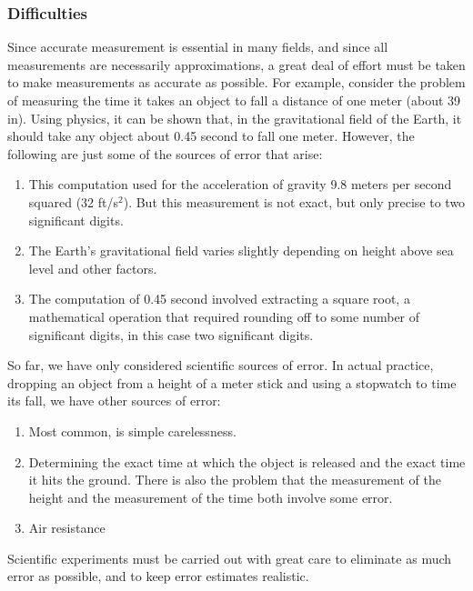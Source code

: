 \subsubsection*{Difficulties}
Since accurate measurement is essential in many fields, and since all measurements are
necessarily approximations, a great deal of effort must be taken to make measurements as
accurate as possible. For example, consider the problem of measuring the time it takes an
object to fall a distance of one meter (about 39 in). Using physics, it can be shown that, in
the gravitational field of the Earth, it should take any object about 0.45 second to fall one
meter. However, the following are just some of the sources of error that arise:
\begin{enumerate}
\item This computation used for the acceleration of gravity 9.8 meters per second squared
(32 ft/s$^2$). But this measurement is not exact, but only precise to two significant
digits.
\item The Earth's gravitational field varies slightly depending on height above sea level and
other factors.
\item The computation of 0.45 second involved extracting a square root, a mathematical
operation that required rounding off to some number of significant digits, in this
case two significant digits.
\end{enumerate}
So far, we have only considered scientific sources of error. In actual practice, dropping
an object from a height of a meter stick and using a stopwatch to time its fall, we have other
sources of error:
\begin{enumerate}
\item Most common, is simple carelessness.
\item Determining the exact time at which the object is released and the exact time it hits
the ground. There is also the problem that the measurement of the height and the
measurement of the time both involve some error.
\item Air resistance
\end{enumerate}
Scientific experiments must be carried out with great care to eliminate as much error as
possible, and to keep error estimates realistic.

